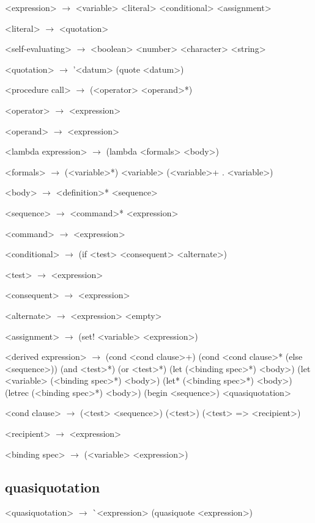 \documentclass[10pt]{article}
\begin{document}
\begin{grammar}
  <expression> $\longrightarrow$ <variable>
  \alt <literal>
  \alt <conditional>
  \alt <assignment>

  <literal> $\longrightarrow$ <quotation> 

  <self-evaluating> $\longrightarrow$ <boolean> \alt <number>
  \alt <character> \alt <string>

  <quotation> $\longrightarrow$ '<datum> \alt (quote <datum>)

  <procedure call> $\longrightarrow$ (<operator> <operand>*)

  <operator> $\longrightarrow$ <expression>

  <operand> $\longrightarrow$ <expression>

  <lambda expression> $\longrightarrow$ (lambda <formals> <body>)

  <formals> $\longrightarrow$ (<variable>*) \alt <variable>
  \alt (<variable>+  .  <variable>)

  <body> $\longrightarrow$ <definition>* <sequence>

  <sequence> $\longrightarrow$ <command>* <expression>

  <command> $\longrightarrow$ <expression>

  <conditional> $\longrightarrow$ (if <test> <consequent> <alternate>)

  <test> $\longrightarrow$ <expression>

  <consequent> $\longrightarrow$ <expression>

  <alternate> $\longrightarrow$ <expression> \alt <empty>

  <assignment> $\longrightarrow$ (set! <variable> <expression>)

  <derived expression> $\longrightarrow$ (cond <cond clause>+)
  \alt (cond <cond clause>* (else <sequence>))
  \alt (and <test>*)
  \alt (or <test>*)
  \alt (let (<binding spec>*) <body>)
  \alt (let <variable> (<binding spec>*) <body>)
  \alt (let* (<binding spec>*) <body>)
  \alt (letrec (<binding spec>*) <body>)
  \alt (begin <sequence>)
  \alt <quasiquotation>

  <cond clause> $\longrightarrow$ (<test> <sequence>)
  \alt (<test>)
  \alt (<test> => <recipient>)

  <recipient> $\longrightarrow$ <expression>

  <binding spec> $\longrightarrow$ (<variable> <expression>)

\end{grammar}

\subsection*{quasiquotation}
\begin{grammar}
  <quasiquotation> $\longrightarrow$ \`{}<expression>
  \alt (quasiquote <expression>)
\end{grammar}
\end{document}
